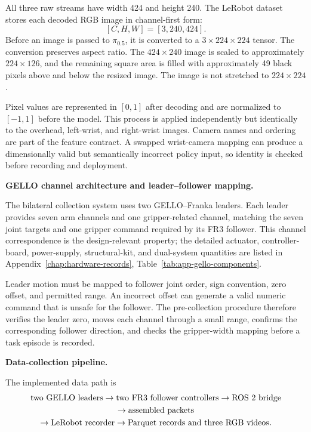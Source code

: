 All three raw streams have width 424 and height 240. The LeRobot dataset stores each decoded RGB image in channel-first form:
\[
[C,H,W]=[3,240,424].
\]
Before an image is passed to $\pi_{0.5}$, it is converted to a \(3\times224\times224\) tensor. The conversion preserves aspect ratio. The \(424\times240\) image is scaled to approximately \(224\times126\), and the remaining square area is filled with approximately 49 black pixels above and below the resized image. The image is not stretched to \(224\times224\).

Pixel values are represented in \([0,1]\) after decoding and are normalized to \([-1,1]\) before the model. This process is applied independently but identically to the overhead, left-wrist, and right-wrist images. Camera names and ordering are part of the feature contract. A swapped wrist-camera mapping can produce a dimensionally valid but semantically incorrect policy input, so identity is checked before recording and deployment.

\medskip
\noindent\textbf{GELLO channel architecture and leader--follower mapping.}

The bilateral collection system uses two GELLO--Franka leaders. Each leader provides seven arm channels and one gripper-related channel, matching the seven joint targets and one gripper command required by its FR3 follower. This channel correspondence is the design-relevant property; the detailed actuator, controller-board, power-supply, structural-kit, and dual-system quantities are listed in Appendix~\ref{chap:hardware-records}, Table~\ref{tab:app-gello-components}.

Leader motion must be mapped to follower joint order, sign convention, zero offset, and permitted range. An incorrect offset can generate a valid numeric command that is unsafe for the follower. The pre-collection procedure therefore verifies the leader zero, moves each channel through a small range, confirms the corresponding follower direction, and checks the gripper-width mapping before a task episode is recorded.

\medskip
\noindent\textbf{Data-collection pipeline.}

The implemented data path is
\begin{multline}
\text{two GELLO leaders}
\rightarrow
\text{two FR3 follower controllers}
\rightarrow
\text{ROS~2 bridge}
\notag\\
\rightarrow
\text{assembled packets}
\notag\\
\rightarrow
\text{LeRobot recorder}
\rightarrow
\text{Parquet records and three RGB videos}.
\label{eq:ch4-data-path}
\end{multline}

